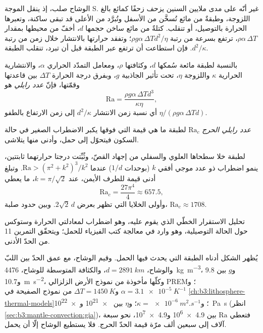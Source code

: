 الوشاح صلب، إذ ينقل الموجة S. غير أنّه على مدى ملايين السنين
يزحف زحفًا كمائع بالغ اللزوجة، وطبقةٌ من مائع تُسخَّن من
الأسفل وتُبرَّد من الأعلى قد تبقى ساكنة، وتعبرها الحرارة
بالتوصيل، أو تنقلب. كتلةٌ من مائع ساخن حجمها $d$، أخفّ من
محيطها بمقدار $\rho\alpha\,\Delta T$، ترتفع بسرعة من رتبة
$\rho g\alpha\,\Delta T d^2/\eta$؛ وتفقد حرارتها بالانتشار خلال زمن من
رتبة $d^2/\kappa$. فإن استطاعت أن ترتفع عبر الطبقة قبل أن تبرد،
تنقلب الطبقة.

\begin{definition}\label{def:b3:mantle-convection:rayleigh}
بالنسبة لطبقة مائعة سُمكها $d$، وكثافتها $\rho$، ومعامل التمدّد الحراري
$\alpha$، والانتشارية الحرارية $\kappa$ واللزوجة $\eta$، تحت تأثير
الجاذبية $g$، وبفرق درجة الحرارة $\Delta T$ بين قاعدتها
وقمّتها، فإنّ \emph{عدد رايلي} هو
\[
  \mathrm{Ra} = \frac{\rho g\alpha\,\Delta T d^3}{\kappa\eta},
\]
أي نسبة زمن الانتشار $d^2/\kappa$ إلى زمن الارتفاع بالطفو
$\eta/(\rho g\alpha\,\Delta Td)$.
\end{definition}

\begin{definition}\label{def:b3:mantle-convection:critical}
\emph{عدد رايلي الحرج}
$\mathrm{Ra}_c$ لطبقة ما هي قيمة  التي فوقها
يكبر الاضطراب الصغير في حالة السكون فيتحوّل إلى حمل، وأدنى منها
يتلاشى.
\end{definition}

\begin{proposition}\label{prop:b3:mantle-convection:onset}
لطبقة خلا سطحاها العلوي والسفلي من إجهاد القصّ، وثُبِّتت درجتا حرارتهما
ثابتتين، ينمو اضطراب ذو عدد موجي أفقي $k$ (بوحدات $1/d$)
عندما $\mathrm{Ra} > (\pi^2 + k^2)^3/k^2$. وتبلغ أدنى قيمة للطرف الأيمن،
عند $k = \pi/\sqrt2$، ما يعطي
\[
  \mathrm{Ra}_c = \frac{27\pi^4}{4} \approx 657.5,
\]
وأولى الخلايا التي تظهر بعرض $2\sqrt2\,d$. وبين حدود صلبة،
$\mathrm{Ra}_c \approx 1708$.
\end{proposition}

\admitted
تحليل الاستقرار الخطّي الذي يقوم عليه، وهو اضطراب لمعادلتي الحرارة وستوكس
حول الحالة التوصيلية، وهو وارد في معالجة كتب الفيزياء
للحمل؛ ويتحقّق التمرين 11 من الحدّ الأدنى.

يُظهر الشكل أدناه الطبقة التي يحدث فيها الحمل. وقيم الوشاح، مع
عمق الحدّ بين اللبّ والوشاح، $d = \qty{2891}{km}$، والكثافة المتوسطة للوشاح،
\qty{4476}{kg.m^{-3}}، و$g$ بين 9.8
و\qty{10.7}{m.s^{-2}}، وكلّها مأخوذة من نموذج الأرض الزلزالي PREM؛ و$\alpha =
\qty{3.1e-5}{K^{-1}}$ و$\Delta T = \qty{1450}{K}$ من نموذج الصفيحة في
\cref{ch:b3:lithosphere-thermal-models}؛ و$\kappa = \qty{e-6}{m^2.s^{-1}}$؛
و$\eta$ بين \num{e21} و\qty{e22}{Pa.s} (انظر \cref{sec:b3:mantle-convection:gia})،
فتعطي $\mathrm{Ra}$ بين \num{4.9e6} و\num{4.9e7}، نحو سبعة آلاف إلى
سبعين ألف مرّة قيمة الحدّ الحرج. فلا يستطيع الوشاح إلّا أن يحمل.

